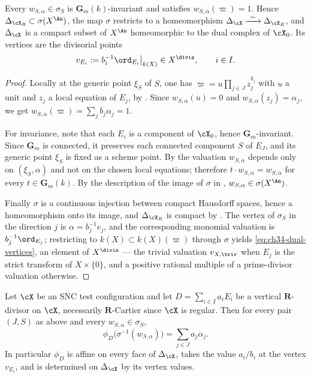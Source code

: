 \begin{lemma}
\label{lem:ch34-skeleton-in-gauss}
Every $w_{S,\alpha}\in\sigma_S$ is
$\mathbf G_m(k)$-invariant and satisfies
$w_{S,\alpha}(\varpi)=1$.  Hence
$\Delta_{\cX_R}\subset\sigma(X^{\An})$, the map $\sigma$ restricts to a
homeomorphism $\Delta_{\cX}\xrightarrow{\ \sim\ }\Delta_{\cX_R}$, and
$\Delta_{\cX}$ is a compact subset of $X^{\An}$ homeomorphic to the dual
complex of $\cX_0$.  Its vertices are the divisorial points
\begin{equation}
\label{eq:ch34-dual-vertices}
 v_{E_i}:=b_i^{-1}\ord_{E_i}\big|_{k(X)}\in X^{\divis},
 \qquad i\in I.
\end{equation}
\end{lemma}

\begin{proof}
Locally at the generic point $\xi_S$ of $S$,
one has $\varpi=u\prod_{j\in J}z_j^{b_j}$ with $u$ a unit and $z_j$ a
local equation of $E_j$, by .  Since
$w_{S,\alpha}(u)=0$ and $w_{S,\alpha}(z_j)=\alpha_j$, we get
$w_{S,\alpha}(\varpi)=\sum_jb_j\alpha_j=1$.

For invariance, note that each $E_i$ is a component of $\cX_0$, hence
$\mathbf G_m$-invariant.  Since $\mathbf G_m$ is connected, it preserves
each connected component $S$ of $E_J$, and its generic point $\xi_S$
is fixed as a scheme point.  By  the valuation
$w_{S,\alpha}$ depends only on $(\xi_S,\alpha)$ and not on the chosen
local equations; therefore $t\cdot w_{S,\alpha}=w_{S,\alpha}$ for every
$t\in\mathbf G_m(k)$.  By the description of the image of $\sigma$ in
,
$w_{S,\alpha}\in\sigma(X^{\An})$.

Finally $\sigma$ is a continuous injection between compact Hausdorff
spaces, hence a homeomorphism onto its image, and
$\Delta_{\cX_R}$ is compact by .  The vertex
of $\sigma_S$ in the direction $j$ is $\alpha=b_j^{-1}e_j$, and the
corresponding monomial valuation is $b_j^{-1}\ord_{E_j}$; restricting to
$k(X)\subset k(X)(\varpi)$ through $\sigma$ yields
\eqref{eq:ch34-dual-vertices}, an element of $X^{\divis}$ --- the trivial
valuation $v_{X,\triv}$ when $E_j$ is the strict transform of
$X\times\{0\}$, and a positive rational multiple of a prime-divisor
valuation otherwise.
\end{proof}

\begin{proposition}
\label{prop:ch34-affine-on-faces}
Let $\cX$ be an SNC test configuration and let
$D=\sum_{i\in I}a_iE_i$ be a vertical $\mathbf R$-divisor on $\cX$,
necessarily $\mathbf R$-Cartier since $\cX$ is regular.  Then for every
pair $(J,S)$ as above and every $w_{S,\alpha}\in\sigma_S$,
\begin{equation}
\label{eq:ch34-affine-formula}
 \phi_D\bigl(\sigma^{-1}(w_{S,\alpha})\bigr)
 =\sum_{j\in J}a_j\alpha_j .
\end{equation}
In particular $\phi_D$ is affine on every face of $\Delta_{\cX}$, takes
the value $a_i/b_i$ at the vertex $v_{E_i}$, and is determined on
$\Delta_{\cX}$ by its vertex values.
\end{proposition}

